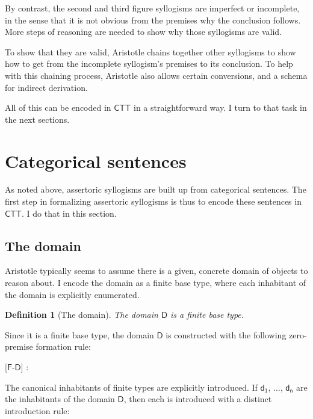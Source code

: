 \documentclass{article}
\newcommand\hypo{\Hypo}
\newcommand\infer{\Infer}
\newtheorem{definition}{Definition}
\newcommand\e{\mathsf}
\newcommand\subs[2]{\e{#1_{#2}}}
\def\CTT/{$\e{CTT}$}
\def\Type/{\e{*}}
\def\Domain/{\e{D}}
\def\FormSymbol/{$\e{F}$}
\newcommand\Form[1]{\FormSymbol/-$#1$}
\begin{document}
By contrast, the second and third figure syllogisms are imperfect or incomplete, in the sense that it is not obvious from the premises why the conclusion follows. More steps of reasoning are needed to show why those syllogisms are valid. 

To show that they are valid, Aristotle chains together other syllogisms to show how to get from the incomplete syllogism's premises to its conclusion. To help with this chaining process, Aristotle also allows certain conversions, and a schema for indirect derivation.

All of this can be encoded in \CTT/ in a straightforward way. I turn to that task in the next sections.


\section{Categorical sentences}
\label{sec:categorical-sentences}

As noted above, assertoric syllogisms are built up from categorical sentences. The first step in formalizing assertoric syllogisms is thus to encode these sentences in \CTT/. I do that in this section.


\subsection{The domain}

Aristotle typically seems to assume there is a given, concrete domain of objects to reason about. I encode the domain as a finite base type, where each inhabitant of the domain is explicitly enumerated.

\begin{definition}[The domain]
  The domain $\Domain/$ is a finite base type. 
\end{definition}

Since it is a finite base type, the domain $\Domain/$ is constructed with the following zero-premise formation rule:

\begin{prooftree*}
  \hypo{}
  \infer1[\Form{\Domain/}]{\Domain/ : \Type/}
\end{prooftree*}

The canonical inhabitants of finite types are explicitly introduced. If $\subs{d}{1}$, $\ldots$, $\subs{d}{n}$ are the inhabitants of the domain $\Domain/$, then each is introduced with a distinct introduction rule:
  
\end{document}
